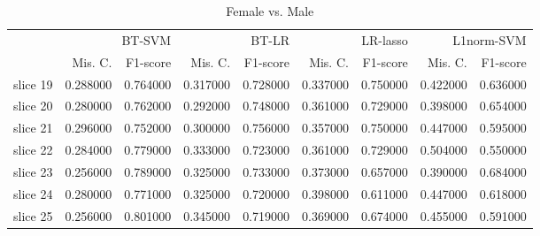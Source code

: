 \begin{table}
\caption{Female vs. Male}
\begin{tabular}{lrrrrrrrr}
\toprule
 & \multicolumn{2}{r}{BT-SVM} & \multicolumn{2}{r}{BT-LR} & \multicolumn{2}{r}{LR-lasso} & \multicolumn{2}{r}{L1norm-SVM} \\
 & Mis. C. & F1-score & Mis. C. & F1-score & Mis. C. & F1-score & Mis. C. & F1-score \\
\midrule
slice 19 & 0.288000 & 0.764000 & 0.317000 & 0.728000 & 0.337000 & 0.750000 & 0.422000 & 0.636000 \\
slice 20 & 0.280000 & 0.762000 & 0.292000 & 0.748000 & 0.361000 & 0.729000 & 0.398000 & 0.654000 \\
slice 21 & 0.296000 & 0.752000 & 0.300000 & 0.756000 & 0.357000 & 0.750000 & 0.447000 & 0.595000 \\
slice 22 & 0.284000 & 0.779000 & 0.333000 & 0.723000 & 0.361000 & 0.729000 & 0.504000 & 0.550000 \\
slice 23 & 0.256000 & 0.789000 & 0.325000 & 0.733000 & 0.373000 & 0.657000 & 0.390000 & 0.684000 \\
slice 24 & 0.280000 & 0.771000 & 0.325000 & 0.720000 & 0.398000 & 0.611000 & 0.447000 & 0.618000 \\
slice 25 & 0.256000 & 0.801000 & 0.345000 & 0.719000 & 0.369000 & 0.674000 & 0.455000 & 0.591000 \\
\bottomrule
\end{tabular}
\end{table}
